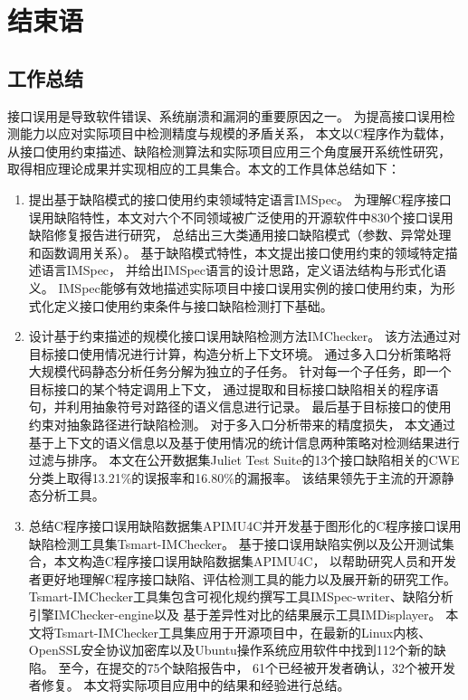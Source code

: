 \chapter{结束语}
\label{cha:con}

\section{工作总结}
接口误用是导致软件错误、系统崩溃和漏洞的重要原因之一。
为提高接口误用检测能力以应对实际项目中检测精度与规模的矛盾关系，
本文以C程序作为载体，从接口使用约束描述、缺陷检测算法和实际项目应用三个角度展开系统性研究，
取得相应理论成果并实现相应的工具集合。本文的工作具体总结如下：
\begin{enumerate}
	\item 提出基于缺陷模式的接口使用约束领域特定语言IMSpec。
	为理解C程序接口误用缺陷特性，本文对六个不同领域被广泛使用的开源软件中830个接口误用缺陷修复报告进行研究，
	总结出三大类通用接口缺陷模式（参数、异常处理和函数调用关系）。
	基于缺陷模式特性，本文提出接口使用约束的领域特定描述语言IMSpec，
	并给出IMSpec语言的设计思路，定义语法结构与形式化语义。
	IMSpec能够有效地描述实际项目中接口误用实例的接口使用约束，为形式化定义接口使用约束条件与接口缺陷检测打下基础。
	
	\item 设计基于约束描述的规模化接口误用缺陷检测方法IMChecker。
	该方法通过对目标接口使用情况进行计算，构造分析上下文环境。
	通过多入口分析策略将大规模代码静态分析任务分解为独立的子任务。
	针对每一个子任务，即一个目标接口的某个特定调用上下文，
	通过提取和目标接口缺陷相关的程序语句，并利用抽象符号对路径的语义信息进行记录。
	最后基于目标接口的使用约束对抽象路径进行缺陷检测。
	对于多入口分析带来的精度损失，
	本文通过基于上下文的语义信息以及基于使用情况的统计信息两种策略对检测结果进行过滤与排序。
	本文在公开数据集Juliet Test Suite的13个接口缺陷相关的CWE分类上取得13.21\%的误报率和16.80\%的漏报率。
	该结果领先于主流的开源静态分析工具。
	
	\item 总结C程序接口误用缺陷数据集APIMU4C并开发基于图形化的C程序接口误用缺陷检测工具集Tsmart-IMChecker。
	基于接口误用缺陷实例以及公开测试集合，本文构造C程序接口误用缺陷数据集APIMU4C，
	以帮助研究人员和开发者更好地理解C程序接口缺陷、评估检测工具的能力以及展开新的研究工作。
	Tsmart-IMChecker工具集包含可视化规约撰写工具IMSpec-writer、缺陷分析引擎IMChecker-engine以及
	基于差异性对比的结果展示工具IMDisplayer。
	本文将Tsmart-IMChecker工具集应用于开源项目中，在最新的Linux内核、
	OpenSSL安全协议加密库以及Ubuntu操作系统应用软件中找到112个新的缺陷。
	至今，在提交的75个缺陷报告中，
	61个已经被开发者确认，32个被开发者修复。
	本文将实际项目应用中的结果和经验进行总结。
	
	
\end{enumerate}


